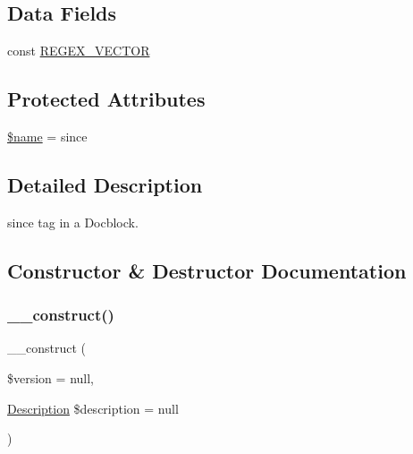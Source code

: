 \subsection*{Data Fields}
\begin{DoxyCompactItemize}
\item 
const \mbox{\hyperlink{classphp_documentor_1_1_reflection_1_1_doc_block_1_1_tags_1_1_since_aec4feb4c31b9abab8a40577d90b872f8}{R\+E\+G\+E\+X\+\_\+\+V\+E\+C\+T\+OR}}
\end{DoxyCompactItemize}
\subsection*{Protected Attributes}
\begin{DoxyCompactItemize}
\item 
\mbox{\hyperlink{classphp_documentor_1_1_reflection_1_1_doc_block_1_1_tags_1_1_since_ab2fc40d43824ea3e1ce5d86dee0d763b}{\$name}} = \textquotesingle{}since\textquotesingle{}
\end{DoxyCompactItemize}


\subsection{Detailed Description}
since tag in a Docblock. 

\subsection{Constructor \& Destructor Documentation}
\mbox{\label{classphp_documentor_1_1_reflection_1_1_doc_block_1_1_tags_1_1_since_a75f67561d733f42ea52230c5b289d264}} 
\subsubsection{\texorpdfstring{\+\_\+\+\_\+construct()}{\_\_construct()}}
{\footnotesize\ttfamily \+\_\+\+\_\+construct (\begin{DoxyParamCaption}\item[{}]{\$version = {\ttfamily null},  }\item[{\mbox{\hyperlink{classphp_documentor_1_1_reflection_1_1_doc_block_1_1_description}{Description}}}]{\$description = {\ttfamily null} }\end{DoxyParamCaption})}



